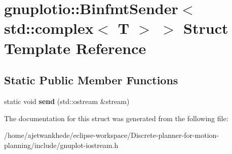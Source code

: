 \hypertarget{structgnuplotio_1_1BinfmtSender_3_01std_1_1complex_3_01T_01_4_01_4}{}\section{gnuplotio\+:\+:Binfmt\+Sender$<$ std\+:\+:complex$<$ T $>$ $>$ Struct Template Reference}
\label{structgnuplotio_1_1BinfmtSender_3_01std_1_1complex_3_01T_01_4_01_4}
\subsection*{Static Public Member Functions}
\begin{DoxyCompactItemize}
\item 
\mbox{\label{structgnuplotio_1_1BinfmtSender_3_01std_1_1complex_3_01T_01_4_01_4_a64633d068c93ef2822ee3aa6ef39d623}} 
static void {\bfseries send} (std\+::ostream \&stream)
\end{DoxyCompactItemize}


The documentation for this struct was generated from the following file\+:\begin{DoxyCompactItemize}
\item 
/home/ajetwankhede/eclipse-\/workspace/\+Discrete-\/planner-\/for-\/motion-\/planning/include/gnuplot-\/iostream.\+h\end{DoxyCompactItemize}
